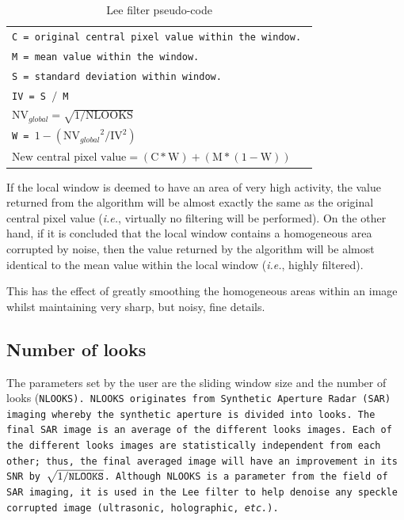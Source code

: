 \documentclass[12pt]{report}
\renewcommand{\baselinestretch}{1.5}
\begin{document}
\renewcommand{\baselinestretch}{1}
\begin{table}[htb]
\begin{center}
\begin{tabular}{|l|} \hline
\noindent
\tt C = original central pixel value within the window. \\
\tt M = mean value within the window. \\
\tt S = standard deviation within window. \\
\tt IV = S $/$ M \\
\tt $\mbox{NV}_{global} = \sqrt{1/\mbox{NLOOKS}}$  \\
\tt W = $1 - ({\mbox{NV}_{global}}^{2} / \mbox{IV}^{2})$  \\
\tt $\mbox{New central pixel value} = (\mbox{C} * \mbox{W})  +  (\mbox{M} * (1 - \mbox{W} ))$ \\ \hline
\end{tabular}
\renewcommand{\baselinestretch}{1.5}
\caption{Lee filter pseudo-code}
\label{leePC}
\renewcommand{\baselinestretch}{1}
\end{center}
\end{table}
\renewcommand{\baselinestretch}{1.5}

If the local window is deemed to have an area of very high activity, the value 
returned from the algorithm will be almost exactly the same as the original
central pixel value (\emph{i.e.}, virtually no filtering will be performed). 
On the other hand, if it is concluded that the local window 
contains a homogeneous area corrupted by noise, then the value returned by the
algorithm will be almost identical to the mean value within the local window
(\emph{i.e.}, highly filtered).

This has the effect of greatly smoothing the homogeneous areas within an 
image whilst maintaining very sharp, but noisy, fine details.

\subsection{Number of looks}
\label{sec:nlooks}
The parameters set by the user are the sliding window size and the number of looks (\tt NLOOKS\rm).
\tt NLOOKS \rm originates from Synthetic Aperture Radar (SAR) imaging whereby the synthetic aperture is divided
into looks. The final SAR image is an average of the different looks images. Each of the 
different looks images are statistically independent from each other; thus, the final 
averaged image will have an improvement in its SNR by $\sqrt {1 / \mbox{\tt NLOOKS\rm}}$.
Although \tt NLOOKS \rm is a parameter from the field of SAR imaging, it is used in the 
Lee filter to help denoise any speckle corrupted image (ultrasonic, holographic, \emph{etc.}).
\end{document}
